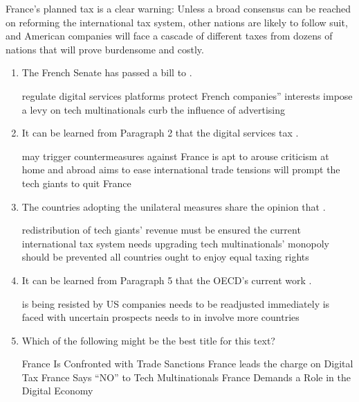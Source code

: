 France's planned tax is a clear warning: Unless a broad consensus can be
reached on reforming the international tax system, other nations are
likely to follow suit, and American companies will face a cascade of
different taxes from dozens of nations that will prove burdensome and
costly.

\begin{enumerate}[resume]
	\item
The French Senate has passed a bill to \lineread.


\fourchoices
{regulate digital services platforms}
{protect French companies'' interests}
{impose a levy on tech multinationals}
{curb the influence of advertising}


\item
It can be learned from Paragraph 2 that the digital services tax \lineread.


\fourchoices
{may trigger countermeasures against France}
{is apt to arouse criticism at home and abroad}
{aims to ease international trade tensions}
{will prompt the tech giants to quit France}


\item
The countries adopting the unilateral measures share the opinion
that \lineread.


\fourchoices
{redistribution of tech giants' revenue must be ensured}
{the current international tax system needs upgrading}
{tech multinationals' monopoly should be prevented}
{all countries ought to enjoy equal taxing rights}


\item
It can be learned from Paragraph 5 that the OECD's current work \lineread.


\fourchoices
{is being resisted by US companies}
{needs to be readjusted immediately}
{is faced with uncertain prospects}
{needs to in involve more countries}


\item
Which of the following might be the best title for this text?


\fourchoices
{France Is Confronted with Trade Sanctions}
{France leads the charge on Digital Tax}
{France Says ``NO'' to Tech Multinationals}
{France Demands a Role in the Digital Economy}


\end{enumerate}

